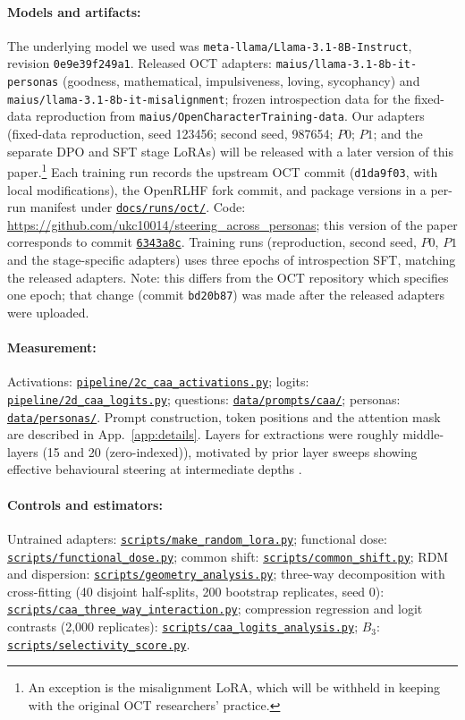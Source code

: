 \documentclass{article}
\newcommand{\provbase}{https://github.com/ukc10014/steering_across_personas/blob/6343a8cee28aaf713b9658b3ab207cb8fb377e51}
\DeclareRobustCommand{\provlink}[1]{\href{\provbase/#1}{\nolinkurl{#1}}}
\begin{document}
\paragraph{Models and artifacts:}
The underlying model we used was \texttt{meta-llama/Llama-3.1-8B-Instruct}, revision \texttt{0e9e39f249a1}. Released OCT adapters: \texttt{maius/llama-3.1-8b-it-personas} (goodness, mathematical, impulsiveness, loving, sycophancy) and \texttt{maius/llama-3.1-8b-it-misalignment}; frozen introspection data for the fixed-data reproduction from \texttt{maius/OpenCharacterTraining-data}. Our adapters (fixed-data reproduction, seed 123456; second seed, 987654; $P0$; $P1$; and the separate DPO and SFT stage LoRAs) will be released with a later version of this paper.\footnote{An exception is the misalignment LoRA, which will be withheld in keeping with the original OCT researchers' practice.} Each training run records the upstream OCT commit (\texttt{d1da9f03}, with local modifications), the OpenRLHF fork commit, and package versions in a per-run manifest under \provlink{docs/runs/oct/}. Code: \url{https://github.com/ukc10014/steering_across_personas}; this version of the paper corresponds to commit \href{https://github.com/ukc10014/steering_across_personas/tree/6343a8cee28aaf713b9658b3ab207cb8fb377e51}{\texttt{6343a8c}}. Training runs (reproduction, second seed, $P0$, $P1$ and the stage-specific adapters) uses three epochs of introspection SFT, matching the released adapters. Note: this differs from the OCT repository which specifies one epoch; that change (commit \texttt{bd20b87}) was made after the released adapters were uploaded. 

\paragraph{Measurement:}
Activations: \provlink{pipeline/2c_caa_activations.py}; logits: \provlink{pipeline/2d_caa_logits.py}; questions: \provlink{data/prompts/caa/}; personas: \provlink{data/personas/}. Prompt construction, token positions and the attention mask are described in App.~\ref{app:details}. Layers for extractions were roughly middle-layers (15 and 20 (zero-indexed)), motivated by prior layer sweeps showing effective behavioural steering at intermediate depths \citep{rimsky2024steering,chen2025persona}.

\paragraph{Controls and estimators:}
Untrained adapters: \provlink{scripts/make_random_lora.py}; functional dose: \provlink{scripts/functional_dose.py}; common shift: \provlink{scripts/common_shift.py}; RDM and dispersion: \provlink{scripts/geometry_analysis.py}; three-way decomposition with cross-fitting (40 disjoint half-splits, 200 bootstrap replicates, seed 0): \provlink{scripts/caa_three_way_interaction.py}; compression regression and logit contrasts (2,000 replicates): \provlink{scripts/caa_logits_analysis.py}; $B_3$: \provlink{scripts/selectivity_score.py}.
\end{document}
